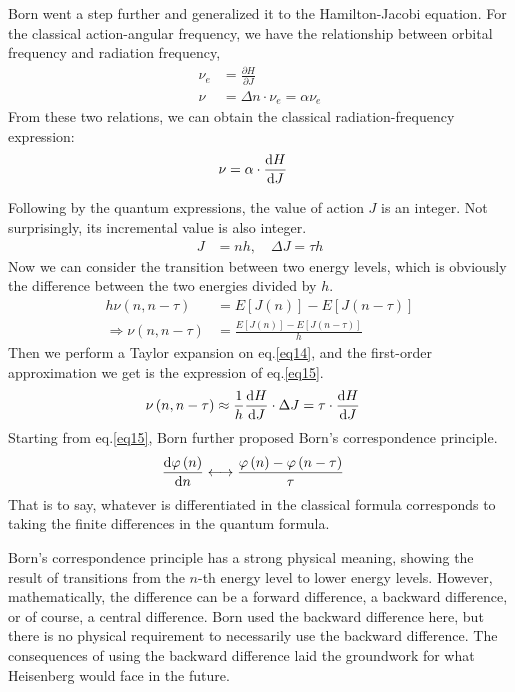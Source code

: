 \documentclass[a4paper, 12pt, oneside, onecolumn]{article}
\newcommand{\cald}{{\rm d}}
\begin{document}
\begin{multicols}{2}
Born went a step further and generalized it to the Hamilton-Jacobi equation. For the classical action-angular frequency, we have the relationship between orbital frequency and radiation frequency,
\begin{align}
	\nu_e
	&= \frac{\partial H}{\partial J} \\
	\nu
	&= \Delta n \cdot \nu_e = \alpha \nu_e
\end{align}
From these two relations, we can obtain the classical radiation-frequency expression:
\begin{align}
	\nu
	&= \alpha \cdot \frac{\cald H}{\cald J}
\end{align}

Following by the quantum expressions, the value of action $J$ is an integer. Not surprisingly, its incremental value is also integer.
\begin{align}
	J
	&= n h, \quad \Delta J = \tau h
\end{align}
Now we can consider the transition between two energy levels, which is obviously the difference between the two energies divided by $h$.
\begin{align}
	h \nu \left( n, n - \tau \right)
	&= E \left[ J \left( n \right) \right] - E \left[ J \left( n - \tau \right) \right] \\
	\Rightarrow \nu \left( n, n - \tau \right)
	&= \frac{E \left[ J \left( n \right) \right] - E \left[ J \left( n - \tau \right) \right]}{h} \label{eq14} 
\end{align}
Then we perform a Taylor expansion on eq.\ref{eq14}, and the first-order approximation we get is the expression of eq.\ref{eq15}.
\begin{align}
	\nu \left( n, n - \tau \right)
	&\approx \frac{1}{h} \frac{\cald H}{\cald J} \cdot \Delta J  = \tau \cdot \frac{\cald H}{\cald J} \label{eq15}
\end{align}
Starting from eq.\ref{eq15}, Born further proposed Born's correspondence principle.
\begin{align}
	\frac{\cald \varphi \left( n \right)}{\cald n}
	& \longleftrightarrow \frac{\varphi \left( n \right) - \varphi \left( n - \tau \right)}{\tau}
\end{align}
That is to say, whatever is differentiated in the classical formula corresponds to taking the finite differences in the quantum formula. 

Born's correspondence principle has a strong physical meaning, showing the result of transitions from the $n$-th energy level to lower energy levels. However, mathematically, the difference can be a forward difference, a backward difference, or of course, a central difference. Born used the backward difference here, but there is no physical requirement to necessarily use the backward difference. The consequences of using the backward difference laid the groundwork for what Heisenberg would face in the future.


\end{multicols}
\end{document}
